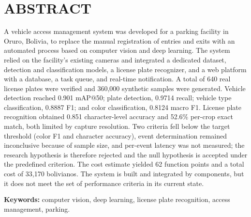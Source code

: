 \section*{ABSTRACT}

A vehicle access management system was developed for a parking facility in Oruro,
Bolivia, to replace the manual registration of entries and exits with an automated
process based on computer vision and deep learning. The system relied on the
facility's existing cameras and integrated a dedicated dataset, detection and
classification models, a license plate recognizer, and a web platform with a
database, a task queue, and real-time notification. A total of 640 real license
plates were verified and 360,000 synthetic samples were generated. Vehicle
detection reached 0.901 mAP@50; plate detection, 0.9714 recall; vehicle type
classification, 0.8887 F1; and color classification, 0.8124 macro F1. License
plate recognition obtained 0.851 character-level accuracy and 52.6\% per-crop
exact match, both limited by capture resolution. Two criteria fell below the
target threshold (color F1 and character accuracy), event determination
remained inconclusive because of sample size, and per-event latency was not
measured; the research hypothesis is therefore rejected and the null hypothesis is
accepted under the predefined criterion. The cost estimate yielded 62 function
points and a total cost of 33,170 bolivianos. The system is built and integrated
by components, but it does not meet the set of performance criteria in its current
state.

\vspace{1em}
\noindent\textbf{Keywords:} computer vision, deep learning, license plate
recognition, access management, parking.
